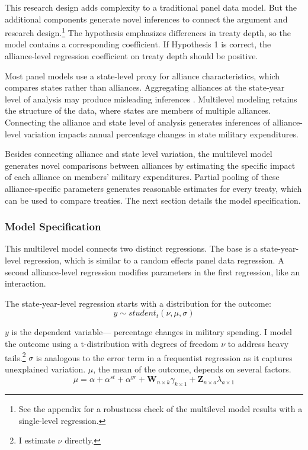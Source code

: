 \documentclass[12pt]{article}
\begin{document}
This research design adds complexity to a traditional panel data model. 
But the additional components generate novel inferences to connect the argument and research design.\footnote{See the appendix for a robustness check of the multilevel model results with a single-level regression.} 
The hypothesis emphasizes differences in treaty depth, so the model contains a corresponding coefficient.
If Hypothesis 1 is correct, the alliance-level regression coefficient on treaty depth should be positive. 


Most panel models use a state-level proxy for alliance characteristics, which compares states rather than alliances.
Aggregating alliances at the state-year level of analysis may produce misleading inferences \citep{McElreath2016}.
Multilevel modeling retains the structure of the data, where states are members of multiple alliances. 
Connecting the alliance and state level of analysis generates inferences of alliance-level variation impacts annual percentage changes in state military expenditures. 


Besides connecting alliance and state level variation, the multilevel model generates novel comparisons between alliances by estimating the specific impact of each alliance on members' military expenditures. 
Partial pooling of these alliance-specific parameters generates reasonable estimates for every treaty, which can be used to compare treaties. 
The next section details the model specification. 
 


\subsubsection{Model Specification} 

This multilevel model connects two distinct regressions. 
The base is a state-year-level regression, which is similar to a random effects panel data regression.
A second alliance-level regression modifies parameters in the first regression, like an interaction. 


The state-year-level regression starts with a distribution for the outcome:
\begin{equation}
y \sim student_t(\nu, \mu, \sigma)
\end{equation}
 

$y$ is the dependent variable--- percentage changes in military spending. 
I model the outcome using a t-distribution with degrees of freedom $\nu$ to address heavy tails.\footnote{I estimate $\nu$ directly.}
$\sigma$ is analogous to the error term in a frequentist regression as it captures unexplained variation.  
$\mu$, the mean of the outcome, depends on several factors.
\begin{equation}
\mu = \alpha + \alpha^{st} + \alpha^{yr} +\textbf{W}_{n \times k} \gamma_{k \times 1}  + \textbf{Z}_{n \times a} \lambda_{a \times 1} 
\end{equation}
\end{document}
